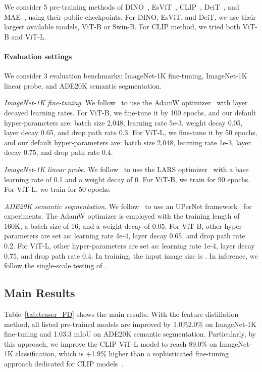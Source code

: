 \documentclass{article}
\begin{document}
We consider 5 pre-training methods of DINO~\cite{caron2021emerging}, EsViT~\cite{li2021esvit}, CLIP~\cite{radford2021clip}, DeiT~\cite{touvron2020deit}, and MAE~\cite{MaskedAutoencoders2021}, using their public checkpoints. For DINO, EsViT, and DeiT, we use their largest available models, ViT-B or Swin-B. For CLIP method, we tried both ViT-B and ViT-L.

\paragraph{Evaluation settings}

We consider 3 evaluation benchmarks: ImageNet-1K fine-tuning, ImageNet-1K linear probe, and ADE20K semantic segmentation.

\noindent \emph{ImageNet-1K fine-tuning}. We follow~\cite{bao2021beit} to use the AdamW optimizer~\cite{kingma2014adam} with layer decayed learning rates. For ViT-B, we fine-tune it by 100 epochs, and our default hyper-parameters are: batch size 2,048, learning rate 5e-3, weight decay 0.05, layer decay 0.65, and drop path rate 0.3. For ViT-L, we fine-tune it by 50 epochs, and our default hyper-parameters are: batch size 2,048, learning rate 1e-3, layer decay 0.75, and drop path rate 0.4.

\noindent \emph{ImageNet-1K linear probe}. We follow~\cite{MaskedAutoencoders2021} to use the LARS optimizer~\cite{you2017large} with a base learning rate of 0.1 and a weight decay of 0. For ViT-B, we train for 90 epochs. For ViT-L, we train for 50 epochs.

\noindent \emph{ADE20K semantic segmentation}. We follow~\cite{liu2021swin} to use an UPerNet framework~\cite{xiao2018upernet} for experiments. The AdamW \cite{kingma2014adam} optimizer is employed with the training length of 160K, a batch size of 16, and a weight decay of 0.05. For ViT-B, other hyper-parameters are set as: learning rate 4e-4, layer decay 0.65, and drop path rate 0.2. For ViT-L, other hyper-parameters are set as: learning rate 1e-4, layer decay 0.75, and drop path rate 0.4. In training, the input image size is . In inference, we follow the single-scale testing of 
\cite{liu2021swin}.

\subsection{Main Results}

Table~\ref{tab:teaser_FD} shows the main results. With the feature distillation method, all listed pre-trained models are improved by 1.0\%2.0\% on ImageNet-1K fine-tuning and 1.03.3 mIoU on ADE20K semantic segmentation. Particularly, by this approach, we improve the CLIP ViT-L model to reach 89.0\% on ImageNet-1K classification, which is +1.9\% higher than a sophisticated fine-tuning approach dedicated for CLIP models~\cite{ftclip2021}. 
\end{document}
